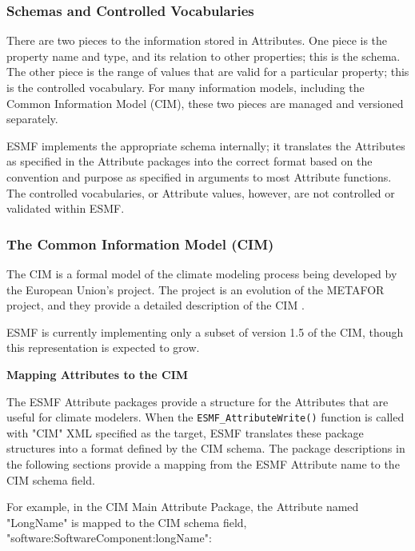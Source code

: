 \subsubsection{Schemas and Controlled Vocabularies}

There are two pieces to the information stored in Attributes.  One piece
is the property name and type, and its relation to other properties; this
is the schema.  The other piece is the range of values that are valid for
a particular property; this is the controlled vocabulary.  For many
information models, including the Common Information Model (CIM), these two
pieces are managed and versioned separately.

ESMF implements the appropriate schema internally; it translates the Attributes
as specified in the Attribute packages into the correct format based on the
convention and purpose as specified in arguments to most Attribute functions.
The controlled vocabularies, or Attribute values, however, are not controlled
or validated within ESMF.

\subsubsection{The Common Information Model (CIM)}

The CIM is a formal model of the climate modeling process being developed by
the European Union's 
project.  The  project
is an evolution of the METAFOR project, and they provide a detailed
description of the CIM .

ESMF is currently implementing only a subset of version 1.5 of the CIM, though this representation is expected to grow.

{\bf Mapping Attributes to the CIM}

The ESMF Attribute packages provide a structure for the Attributes that
are useful for climate modelers.  When the {\tt ESMF\_AttributeWrite()}
function is
called with "CIM" XML specified as the target, ESMF translates these package
structures into a format defined by the CIM schema.  The package descriptions
in the following sections provide a mapping from the ESMF Attribute name
to the CIM schema field.

For example, in the CIM Main Attribute Package, the Attribute named
"LongName" is mapped to the CIM schema field,
"software:SoftwareComponent:longName":


